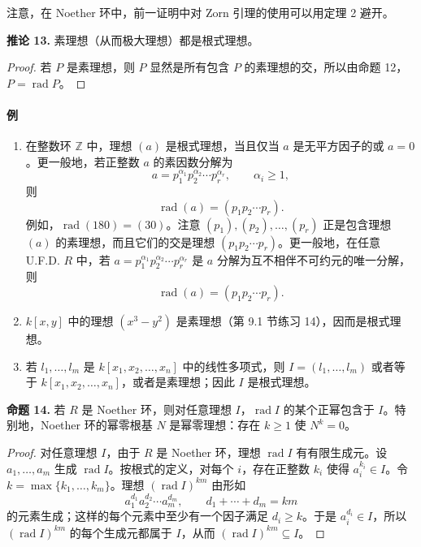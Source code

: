 注意，在 Noether 环中，前一证明中对 Zorn 引理的使用可以用定理 2 避开。

\noindent\textbf{推论 13.} 素理想（从而极大理想）都是根式理想。

\begin{proof}
	若 $P$ 是素理想，则 $P$ 显然是所有包含 $P$ 的素理想的交，所以由命题 12，$P=\operatorname{rad}P$。
\end{proof}

\paragraph{例}
\begin{enumerate}[label=(\arabic*)]
	\item 在整数环 $\mathbb Z$ 中，理想 $(a)$ 是根式理想，当且仅当 $a$ 是无平方因子的或 $a=0$。更一般地，若正整数 $a$ 的素因数分解为
	\[
	a=p_1^{\alpha_1}p_2^{\alpha_2}\cdots p_r^{\alpha_r},\qquad \alpha_i\geq1,
	\]
	则
	\[
	\operatorname{rad}(a)=(p_1p_2\cdots p_r).
	\]
	例如，$\operatorname{rad}(180)=(30)$。注意 $(p_1),(p_2),\ldots,(p_r)$ 正是包含理想 $(a)$ 的素理想，而且它们的交是理想 $(p_1p_2\cdots p_r)$。更一般地，在任意 U.F.D. $R$ 中，若 $a=p_1^{\alpha_1}p_2^{\alpha_2}\cdots p_r^{\alpha_r}$ 是 $a$ 分解为互不相伴不可约元的唯一分解，则
	\[
	\operatorname{rad}(a)=(p_1p_2\cdots p_r).
	\]
	\item $k[x,y]$ 中的理想 $(x^3-y^2)$ 是素理想（第 9.1 节练习 14），因而是根式理想。
	\item 若 $l_1,\ldots,l_m$ 是 $k[x_1,x_2,\ldots,x_n]$ 中的线性多项式，则 $I=(l_1,\ldots,l_m)$ 或者等于 $k[x_1,x_2,\ldots,x_n]$，或者是素理想；因此 $I$ 是根式理想。
\end{enumerate}

\noindent\textbf{命题 14.} 若 $R$ 是 Noether 环，则对任意理想 $I$，$\operatorname{rad}I$ 的某个正幂包含于 $I$。特别地，Noether 环的幂零根基 $N$ 是幂零理想：存在 $k\geq1$ 使 $N^k=0$。

\begin{proof}
	对任意理想 $I$，由于 $R$ 是 Noether 环，理想 $\operatorname{rad}I$ 有有限生成元。设 $a_1,\ldots,a_m$ 生成 $\operatorname{rad}I$。按根式的定义，对每个 $i$，存在正整数 $k_i$ 使得 $a_i^{k_i}\in I$。令 $k=\max\{k_1,\ldots,k_m\}$。理想 $(\operatorname{rad}I)^{km}$ 由形如
	\[
	a_1^{d_1}a_2^{d_2}\cdots a_m^{d_m},\qquad d_1+\cdots+d_m=km
	\]
	的元素生成；这样的每个元素中至少有一个因子满足 $d_i\geq k$。于是 $a_i^{d_i}\in I$，所以 $(\operatorname{rad}I)^{km}$ 的每个生成元都属于 $I$，从而 $(\operatorname{rad}I)^{km}\subseteq I$。
\end{proof}

